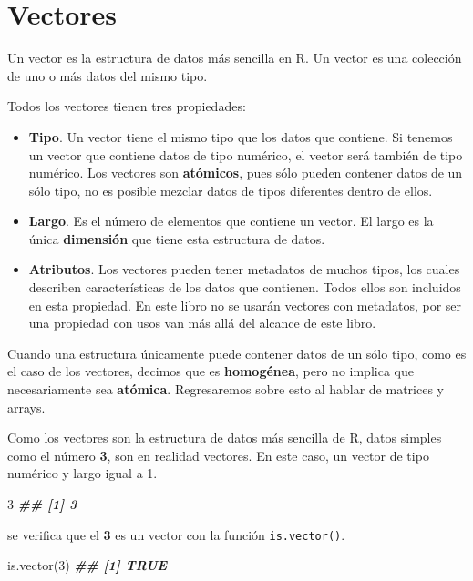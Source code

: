 \documentclass[
]{book}
\newenvironment{Shaded}{\begin{snugshade}}{\end{snugshade}}
\newcommand{\DecValTok}[1]{\textcolor[rgb]{0.00,0.00,0.81}{#1}}
\newcommand{\DocumentationTok}[1]{\textcolor[rgb]{0.56,0.35,0.01}{\textbf{\textit{#1}}}}
\newcommand{\FunctionTok}[1]{\textcolor[rgb]{0.00,0.00,0.00}{#1}}
\newcommand{\NormalTok}[1]{#1}
\begin{document}
\hypertarget{vectores-1}{%
\section{Vectores}\label{vectores-1}}

Un vector es la estructura de datos más sencilla en R. Un vector es una colección de uno o más datos del mismo tipo.

Todos los vectores tienen tres propiedades:

\begin{itemize}
\item
  \textbf{Tipo}. Un vector tiene el mismo tipo que los datos que contiene. Si tenemos un vector que contiene datos de tipo numérico, el vector será también de tipo numérico. Los vectores son \textbf{atómicos}, pues sólo pueden contener datos de un sólo tipo, no es posible mezclar datos de tipos diferentes dentro de ellos.
\item
  \textbf{Largo}. Es el número de elementos que contiene un vector. El largo es la única \textbf{dimensión} que tiene esta estructura de datos.
\item
  \textbf{Atributos}. Los vectores pueden tener metadatos de muchos tipos, los cuales describen características de los datos que contienen. Todos ellos son incluidos en esta propiedad. En este libro no se usarán vectores con metadatos, por ser una propiedad con usos van más allá del alcance de este libro.
\end{itemize}

Cuando una estructura únicamente puede contener datos de un sólo tipo, como es el caso de los vectores, decimos que es \textbf{homogénea}, pero no implica que necesariamente sea \textbf{atómica}. Regresaremos sobre esto al hablar de matrices y arrays.

Como los vectores son la estructura de datos más sencilla de R, datos simples como el número \textbf{3}, son en realidad vectores. En este caso, un vector de tipo numérico y largo igual a 1.

\begin{Shaded}
\begin{Highlighting}[]
\DecValTok{3}
\DocumentationTok{\#\# [1] 3}
\end{Highlighting}
\end{Shaded}

se verifica que el \textbf{3} es un vector con la función \texttt{is.vector()}.

\begin{Shaded}
\begin{Highlighting}[]
\FunctionTok{is.vector}\NormalTok{(}\DecValTok{3}\NormalTok{)}
\DocumentationTok{\#\# [1] TRUE}
\end{Highlighting}
\end{Shaded}
\end{document}
